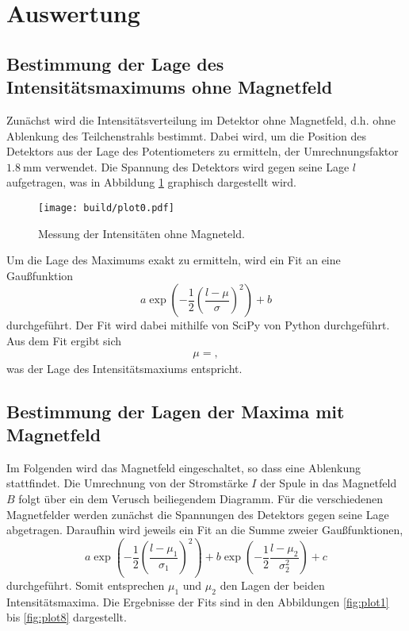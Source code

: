 \section{Auswertung}
\label{sec:Auswertung}
\subsection{Bestimmung der Lage des Intensitätsmaximums ohne Magnetfeld}

Zunächst wird die Intensitätsverteilung im Detektor ohne Magnetfeld, d.h. ohne Ablenkung des Teilchenstrahls bestimmt.
Dabei wird, um die Position des Detektors aus der Lage des Potentiometers zu ermitteln, der Umrechnungsfaktor $\SI{1.8}{\milli\metre}$ verwendet.
Die Spannung des Detektors wird gegen seine Lage $l$ aufgetragen, was in Abbildung \ref{fig:plot0} graphisch dargestellt wird.
\begin{figure}
  \centering
  \texttt{[image: build/plot0.pdf]}
  \caption{Messung der Intensitäten ohne Magneteld.}
  \label{fig:plot0}
\end{figure}
Um die Lage des Maximums exakt zu ermitteln, wird ein Fit an eine Gaußfunktion
\begin{equation}
  a \exp{\left( -\frac{1}{2} \left( \frac{l - \mu}{\sigma}\right)^2 \right)} + b
\end{equation}
durchgeführt.
Der Fit wird dabei mithilfe von SciPy von Python durchgeführt.
Aus dem Fit ergibt sich
\begin{align*}
  \mu = ,
\end{align*}
was der Lage des Intensitätsmaxiums entspricht.

\subsection{Bestimmung der Lagen der Maxima mit Magnetfeld}
Im Folgenden wird das Magnetfeld eingeschaltet, so dass eine Ablenkung stattfindet.
Die Umrechnung von der Stromstärke $I$ der Spule in das Magnetfeld $B$ folgt über ein dem Verusch beiliegendem Diagramm.
Für die verschiedenen Magnetfelder werden zunächst die Spannungen des Detektors gegen seine Lage abgetragen.
Daraufhin wird jeweils ein Fit an die Summe zweier Gaußfunktionen,
\begin{equation}
  a \exp{\left( -\frac{1}{2} \left(\frac{l - \mu_1}{\sigma_1}\right)^2 \right)} +  b \exp{\left( -\frac{1}{2} \frac{l - \mu_2}{\sigma_2^2} \right)} + c
\end{equation}
durchgeführt.
Somit entsprechen $\mu_1$ und $\mu_2$ den Lagen der beiden Intensitätsmaxima.
Die Ergebnisse der Fits sind in den Abbildungen \ref{fig:plot1} bis \ref{fig:plot8} dargestellt.

